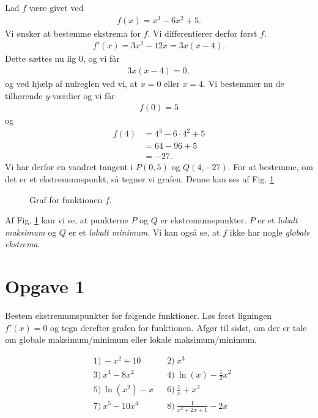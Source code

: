 \begin{exa}
	Lad $f$ være givet ved
	\begin{align*}
		f(x) = x^3-6x^2+5.
	\end{align*}
	Vi ønsker at bestemme ekstrema for $f$. Vi differentierer derfor først $f$.
	\begin{align*}
		f'(x) = 3x^2-12x = 3x(x-4).
	\end{align*}
	Dette sættes nu lig $0$, og vi får
	\begin{align*}
		3x(x-4) = 0, 
	\end{align*}
	og ved hjælp af nulreglen ved vi, at $x=0$ eller $x = 4$. Vi bestemmer nu de tilhørende $y$-værdier og vi får
	\begin{align*}
		f(0) = 5
	\end{align*}
	og 
	\begin{align*}
		f(4) &= 4^3 - 6\cdot 4^2+5\\
		&= 64-96+5\\
		&= -27.
	\end{align*}
	Vi har derfor en vandret tangent i $P(0,5)$ og $Q(4,-27)$. For at bestemme, om det er et ekstremumspunkt, så tegner vi grafen. Denne kan ses af Fig. \ref{fig:ekstrema}
	\begin{figure}[H]
		\centering
		\caption{Graf for funktionen $f$.}
		\label{fig:ekstrema}
	\end{figure}
\end{exa}
Af Fig. \ref{fig:ekstrema} kan vi se, at punkterne $P$ og $Q$ er ekstremumspunkter. $P$ er et \textit{lokalt maksimum} og $Q$ er et \textit{lokalt minimum}. Vi kan også se, at $f$ ikke har nogle 
\textit{globale ekstrema}.

\section*{Opgave 1}

Bestem ekstremumspunkter for følgende funktioner. Løs først ligningen $f'(x)=0$ og tegn derefter grafen for funktionen.  Afgør til sidst, om der er tale om globale maksimum/minimum eller lokale maksimum/minimum.

\begin{align*}
	&1) \ -x^2+10    &&2) \  x^3     \\
	&3) \  x^4-8x^2   &&4) \ \ln(x) - \frac{1}{2}x^2      \\
	&5) \ \ln(x^2)-x    &&6) \   \frac{1}{x} +x^2    \\
	&7) \  x^5-10x^4   &&8) \ \frac{1}{x^2+2x+1} - 2x      \\
\end{align*}